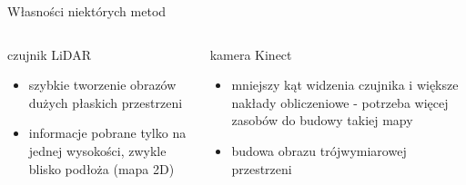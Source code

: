 \begin{frame}{Własności niektórych metod}
	\begin{columns}
		\begin{column}{0.5\textwidth}
			\begin{center}
				czujnik LiDAR
			\end{center}
			\begin{itemize}
				\item szybkie tworzenie obrazów dużych płaskich przestrzeni
				\item informacje pobrane tylko na jednej wysokości, zwykle blisko podłoża (mapa 2D)
			\end{itemize}
		\end{column}
		\begin{column}{0.5\textwidth}  %
			\begin{center}
				kamera Kinect
			\end{center}
			\begin{itemize}
				\item mniejszy kąt widzenia czujnika i większe nakłady obliczeniowe - potrzeba więcej zasobów do budowy takiej mapy				
				\item budowa obrazu trójwymiarowej przestrzeni
			\end{itemize}
		\end{column}
	\end{columns}
\end{frame}
